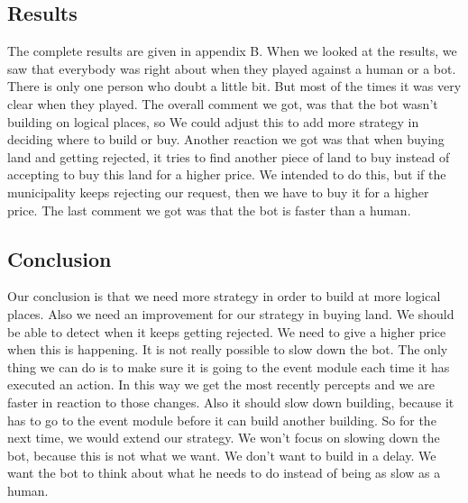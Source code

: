 \subsection{Results}
The complete results are given in appendix B.
When we looked at the results, we saw that everybody was right about when they played against a human or a bot. There is only one person who doubt a little bit. But most of the times it was very clear when they played. The overall comment we got, was that the bot wasn't building on logical places, so We could adjust this to add more strategy in deciding where to build or buy. Another reaction we got was that when buying land and getting rejected, it tries to find another piece of land to buy instead of accepting to buy this land for a higher price. We intended to do this, but if the municipality keeps rejecting our request, then we have to buy it for a higher price. The last comment we got was that the bot is faster than a human. 
\subsection{Conclusion}
Our conclusion is that we need more strategy in order to build at more logical places. Also we need an improvement for our strategy in buying land. We should be able to detect when it keeps getting rejected. We need to give a higher price when this is happening. It is not really possible to slow down the bot. The only thing we can do is to make sure it is going to the event module each time it has executed an action. In this way we get the most recently percepts and we are faster in reaction to those changes. Also it should slow down building, because it has to go to the event module before it can build another building. So for the next time, we would extend our strategy. We won't focus on slowing down the bot, because this is not what we want. We don't want to build in a delay. We want the bot to think about what he needs to do instead of being as slow as a human.
\newpage